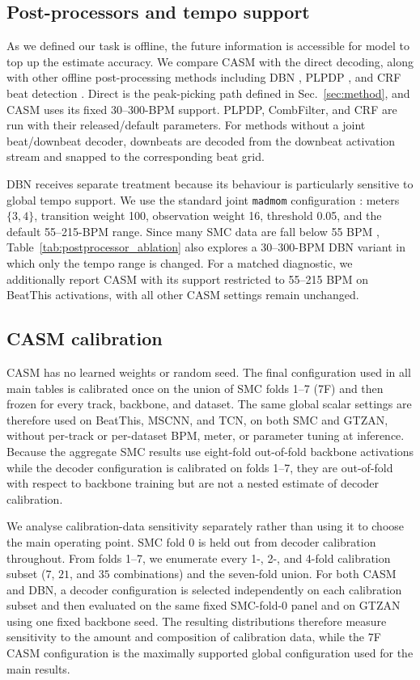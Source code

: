 \documentclass{article}
\begin{document}

\subsection{Post-processors and tempo support}
As we defined our task is offline, the future information is accessible for model to top up the estimate accuracy. We compare CASM with the direct decoding, along with other offline post-processing methods including DBN \cite{krebs2015dbn}, PLPDP \cite{chiu2023localperiodicity}, and CRF beat detection \cite{korzeniowski2014crf}. Direct is the peak-picking path defined in Sec.~\ref{sec:method}, and CASM uses its fixed 30--300-BPM support. PLPDP, CombFilter, and CRF are run with their released/default parameters. For methods without a joint beat/downbeat decoder, downbeats are decoded from the downbeat activation stream and snapped to the corresponding beat grid.

DBN receives separate treatment because its behaviour is particularly sensitive to global tempo support. We use the standard joint \texttt{madmom} configuration \cite{krebs2015dbn}: meters $\{3,4\}$, transition weight 100, observation weight 16, threshold 0.05, and the default 55--215-BPM range. Since many SMC data are fall below 55 BPM \cite{ahn2026smcblindspot}, Table~\ref{tab:postprocessor_ablation} also explores a 30--300-BPM DBN variant in which only the tempo range is changed. For a matched diagnostic, we additionally report CASM with its support restricted to 55--215 BPM on BeatThis activations, with all other CASM settings remain unchanged.

\subsection{CASM calibration}
CASM has no learned weights or random seed. The final configuration used in all main tables is calibrated once on the union of SMC folds 1--7 (7F) and then frozen for every track, backbone, and dataset. The same global scalar settings are therefore used on BeatThis, MSCNN, and TCN, on both SMC and GTZAN, without per-track or per-dataset BPM, meter, or parameter tuning at inference. Because the aggregate SMC results use eight-fold out-of-fold backbone activations while the decoder configuration is calibrated on folds 1--7, they are out-of-fold with respect to backbone training but are not a nested estimate of decoder calibration.

We analyse calibration-data sensitivity separately rather than using it to choose the main operating point. SMC fold 0 is held out from decoder calibration throughout. From folds 1--7, we enumerate every 1-, 2-, and 4-fold calibration subset ($7$, $21$, and $35$ combinations) and the seven-fold union. For both CASM and DBN, a decoder configuration is selected independently on each calibration subset and then evaluated on the same fixed SMC-fold-0 panel and on GTZAN using one fixed backbone seed. The resulting distributions therefore measure sensitivity to the amount and composition of calibration data, while the 7F CASM configuration is the maximally supported global configuration used for the main results.
\end{document}
